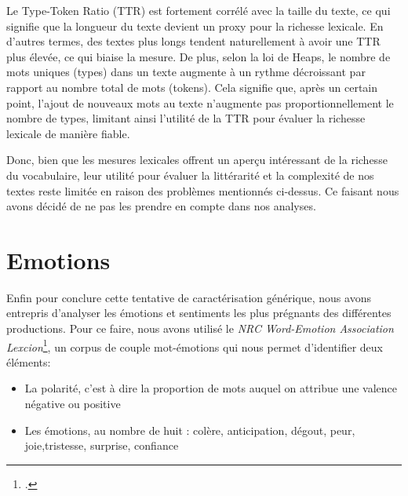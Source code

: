 \documentclass[12pt,a4paper,oneside,titlepage]{book} %
\begin{document}
Le Type-Token Ratio (TTR) est fortement corrélé avec la taille du texte, ce qui signifie que la longueur du texte devient un proxy pour la richesse lexicale. En d'autres termes, des textes plus longs tendent naturellement à avoir une TTR plus élevée, ce qui biaise la mesure. De plus, selon la loi de Heaps, le nombre de mots uniques (types) dans un texte augmente à un rythme décroissant par rapport au nombre total de mots (tokens). Cela signifie que, après un certain point, l'ajout de nouveaux mots au texte n'augmente pas proportionnellement le nombre de types, limitant ainsi l'utilité de la TTR pour évaluer la richesse lexicale de manière fiable. 

Donc, bien que les mesures lexicales offrent un aperçu intéressant de la richesse du vocabulaire, leur utilité pour évaluer la littérarité et la complexité de nos textes reste limitée en raison des problèmes mentionnés ci-dessus. Ce faisant nous avons décidé de ne pas les prendre en compte dans nos analyses.
	
	\section{Emotions}
	
	Enfin pour conclure cette tentative de caractérisation générique, nous avons entrepris d'analyser les émotions et sentiments les plus prégnants des différentes productions. Pour ce faire, nous avons utilisé le \emph{NRC Word-Emotion Association Lexcion}\footcite{mohammad_crowdsourcing_2013}, un corpus de couple mot-émotions qui nous permet d'identifier deux éléments: 
	
	 \begin{itemize}
	 	\item La polarité, c'est à dire la proportion de mots auquel on attribue une valence négative ou positive
	 	\item Les émotions, au nombre de huit : colère, anticipation, dégout, peur, joie,tristesse, surprise, confiance
	 \end{itemize}
	 
\end{document}
